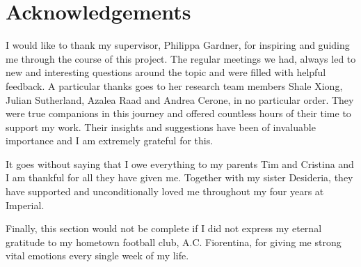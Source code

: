 \vspace*{\fill}
	\section*{Acknowledgements}
	
	I would like to thank my supervisor, Philippa Gardner, for inspiring and guiding me through the course of this project. The regular meetings we had, always led to new and interesting questions around the topic and were filled with helpful feedback. A particular thanks goes to her research team members Shale Xiong, Julian Sutherland, Azalea Raad and Andrea Cerone, in no particular order. They were true companions in this journey and offered countless hours of their time to support my work. Their insights and suggestions have been of invaluable importance and I am extremely grateful for this.
	
	It goes without saying that I owe everything to my parents Tim and Cristina and I am thankful for all they have given me. Together with my sister Desideria, they have supported and unconditionally loved me throughout my four years at Imperial.
	
	Finally, this section would not be complete if I did not express my eternal gratitude to my hometown football club, A.C. Fiorentina, for giving me strong vital emotions every single week of my life.
\vspace*{\fill}